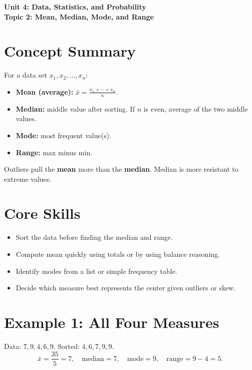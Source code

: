 \documentclass[14pt]{extarticle}
\begin{document}
\raggedright
{}

\begin{center}
    \LARGE \textbf{Unit 4: Data, Statistics, and Probability} \\[6pt]
    \Large \textbf{Topic 2: Mean, Median, Mode, and Range}
\end{center}

\vspace{1em}

\section*{Concept Summary}

For a data set \(x_1,x_2,\dots,x_n\):
\begin{itemize}
  \item \textbf{Mean (average):} \(\displaystyle \bar{x}=\frac{x_1+\cdots+x_n}{n}\).
  \item \textbf{Median:} middle value after sorting. If \(n\) is even, average of the two middle values.
  \item \textbf{Mode:} most frequent value(s).
  \item \textbf{Range:} max minus min.
\end{itemize}

Outliers pull the \textbf{mean} more than the \textbf{median}. Median is more resistant to extreme values.

\section*{Core Skills}
\begin{itemize}
  \item Sort the data before finding the median and range.
  \item Compute mean quickly using totals or by using balance reasoning.
  \item Identify modes from a list or simple frequency table.
  \item Decide which measure best represents the center given outliers or skew.
\end{itemize}

\section*{Example 1: All Four Measures}

Data: \(7, 9, 4, 6, 9\). Sorted: \(4,6,7,9,9\).
\[
\bar{x}=\frac{35}{5}=7,\quad \text{median}=7,\quad \text{mode}=9,\quad \text{range}=9-4=5.
\]
\end{document}
